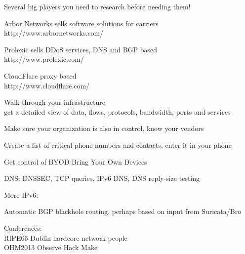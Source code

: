 \documentclass[20pt,landscape,a4paper,footrule]{foils}
\begin{document}

\begin{list1}
\item Several big players you need to research before needing them!
\item Arbor Networks sells software solutions for carriers\\
http://www.arbornetworks.com/

\item Prolexic sells DDoS services, DNS and BGP based\\
http://www.prolexic.com/

\item CloudFlare proxy based\\
http://www.cloudflare.com/
\end{list1}









\begin{list1}
\item Walk through your infrastructure\\
get a detailed view of data, flows, protocols, bandwidth, ports and services
\item Make sure your organization is also in control, know your vendors
\item Create a list of critical phone numbers and contacts, enter it in your phone
\item Get control of BYOD Bring Your Own Devices
\end{list1}



\begin{list1}
\item DNS: DNSSEC, TCP queries, IPv6 DNS, DNS reply-size testing
\item More IPv6: 
\item Automatic BGP blackhole routing, perhaps based on input from Suricata/Bro
\item Conferences:\\
RIPE66 Dublin hardcore network people \\
OHM2013 Observe Hack Make 
\end{list1}
\end{document}

